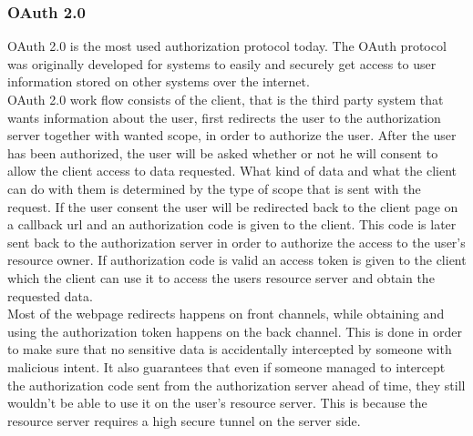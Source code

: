 \subsubsection{OAuth 2.0}
OAuth 2.0 is the most used authorization protocol today. The OAuth protocol was originally developed for systems to easily and securely get access to user information stored on other systems over the internet.\\
OAuth 2.0 work flow consists of the client, that is the third party system that wants information about the user, first redirects the user to the authorization server together with wanted scope, in order to authorize the user. After the user has been authorized, the user will be asked whether or not he will consent to allow the client access to data requested. What kind of data and what the client can do with them is determined by the type of scope that is sent with the request. If the user consent the user will be redirected back to the client page on a callback url and an authorization code is given to the client. This code is later sent back to the authorization server in order to authorize the access to the user's resource owner. If authorization code is valid an access token is given to the client which the client can use it to access the users resource server and obtain the requested data.\\
Most of the webpage redirects happens on front channels, while obtaining and using the authorization token happens on the back channel. This is done in order to make sure that no sensitive data is accidentally intercepted by someone with malicious intent. It also guarantees that even if someone managed to intercept the authorization code sent from the authorization server ahead of time, they still wouldn't be able to use it on the user's resource server. This is because the resource server requires a high secure tunnel on the server side.